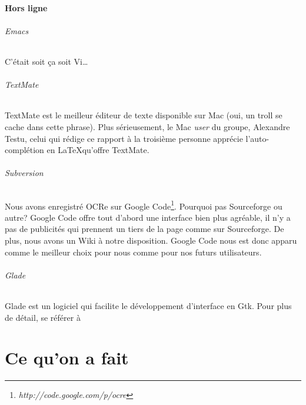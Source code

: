 \documentclass[]{report}
\begin{document}
		\subsection{Hors ligne} %
		\label{sub:hors_ligne}
			\paragraph{Emacs\\} %
			\label{par:emacs}
				C'\'etait soit \c ca soit Vi\ldots
			\paragraph{TextMate\\} %
			\label{par:textmate}
				TextMate est le meilleur \'editeur de texte disponible sur Mac (oui, un troll se cache dans cette phrase). Plus s\'erieusement, le Mac \emph{user} du groupe, Alexandre Testu, celui qui r\'edige ce rapport \`a la troisi\`eme personne appr\'ecie l'auto-compl\'etion en \LaTeX qu'offre TextMate.
			\paragraph{Subversion\\} %
			\label{par:subversion}
				Nous avons enregistr\'e OCRe sur Google Code\footnote{\emph{http://code.google.com/p/ocre}}. Pourquoi pas Sourceforge ou autre? Google Code offre tout d'abord une interface bien plus agr\'eable, il n'y a pas de publicit\'es qui prennent un tiers de la page comme sur Sourceforge. De plus, nous avons un Wiki \`a notre disposition. Google Code nous est donc apparu comme le meilleur choix pour nous comme pour nos futurs utilisateurs.
			\paragraph{Glade} %
				Glade est un logiciel qui facilite le d\'eveloppement d'interface en Gtk. Pour plus de d\'etail, se r\'ef\'erer \`a %
			\label{par:glade}





\part{Ce qu'on a fait} %
\label{prt:ce_qu_on_a_fait}
\end{document}
